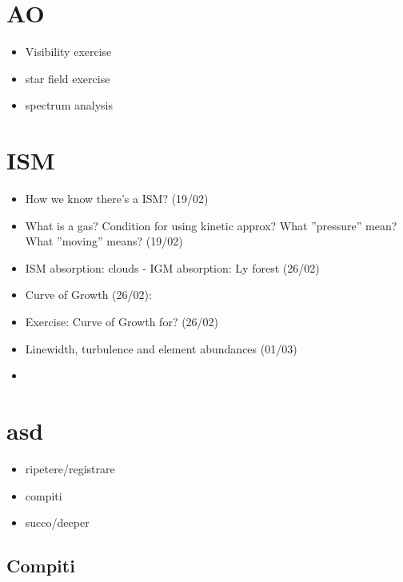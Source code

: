 \documentclass[10pt,xcolor={usenames},fleqn,mathserif,serif]{beamer}
\begin{document}
\section{AO}

\begin{itemize}
    \item Visibility exercise
    \item star field exercise
    \item spectrum analysis
\end{itemize}

\section{ISM}

\begin{itemize}
    \item How we know there's a ISM? (19/02)
    \item What is a gas? Condition for using kinetic approx? What ''pressure'' mean? What ''moving'' means? (19/02)
    \item ISM absorption: clouds - IGM absorption: Ly forest (26/02)
    \item Curve of Growth (26/02):
    \item Exercise: Curve of Growth for? (26/02)
    \item Linewidth, turbulence and element abundances (01/03)
    \item 
\end{itemize}


\section{asd}

\begin{itemize}
    \item ripetere/registrare
    \item compiti
    \item succo/deeper
\end{itemize}

\subsection{Compiti}
\end{document}
